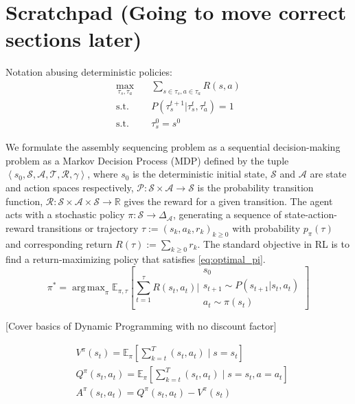 \documentclass{article}
\DeclareMathOperator*{\argmax}{arg\,max}
\begin{document}
\color{red} 
\section{Scratchpad (Going to move correct sections later)}
\color{black}
Notation abusing deterministic policies:
\begin{equation}
    \begin{aligned}
        \max_{\tau_s, \tau_a} \quad & \sum_{s\in \tau_s, a \in \tau_a}{R(s,a)}\\
        \textrm{s.t.} \quad & P(\tau_{s}^{t+1}|\tau_s^t,\tau_a^t) = 1\\
        \textrm{s.t.} \quad & \tau_s^0 = s^0
    \end{aligned}    
\end{equation}

We formulate the assembly sequencing problem as a sequential decision-making problem as a Markov Decision Process (MDP) defined by the tuple $\left\langle s_0, \mathcal{S}, \mathcal{A}, \mathcal{T}, \mathcal{R}, \gamma\right\rangle$, where $s_0$ is the deterministic initial state, $\mathcal{S}$ and $\mathcal{A}$ are state and action spaces respectively, $\mathcal{P}: \mathcal{S} \times \mathcal{A} \rightarrow \mathcal{S}$ is the probability transition function, $\mathcal{R}: \mathcal{S} \times \mathcal{A} \times \mathcal{S} \rightarrow \mathbb{R}$ gives the reward for a given transition. The agent acts with a stochastic policy $\pi: \mathcal{S} \rightarrow \Delta_{\mathcal{A}}$, generating a sequence of state-action-reward transitions or trajectory $\tau:=\left(s_k, a_k, r_k\right)_{k \geq 0}$ with probability $p_\pi(\tau)$ and corresponding return $R(\tau):=\sum_{k \geq 0}  r_k$. The standard objective in RL is to find a return-maximizing policy that satisfies \ref{eq:optimal_pi}.
\begin{equation} \label{eq:optimal_pi}
    \pi^* = \argmax_{\pi} \mathbb{E}_{\pi, \tau}\left [\sum_{t=1}^{\tau} R(s_t,a_t) \bigg| 
    \begin{array}{c}
        s_0\\
        s_{t+1}\sim P(s_{t+1} | s_t, a_t)\\
        a_t\sim \pi(s_t)
    \end{array}
    \right ]
\end{equation}

\color{red}[Cover basics of Dynamic Programming with no discount factor]\color{black}

\begin{equation}
    \begin{aligned}
    & V^\pi\left(s_t\right)=\mathbb{E}_\pi\left[\sum_{k=t}^T \left(s_t, a_t\right) \mid s=s_t\right] \\
    & Q^\pi\left(s_t, a_t\right)=\mathbb{E}_\pi\left[\sum_{k=t}^T \left(s_t, a_t\right) \mid s=s_t, a=a_t\right] \\
    & A^\pi\left(s_t, a_t\right)=Q^\pi\left(s_t, a_t\right)-V^\pi\left(s_t\right)
    \end{aligned}
\end{equation}
\end{document}
